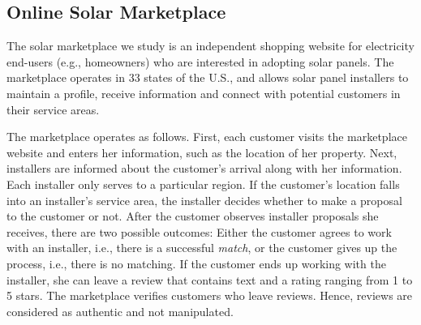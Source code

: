 \documentclass[mnsc,blindrev]{informs3}
\begin{document}
	
	
	
	
	
	\subsection{Online Solar Marketplace}
	
	The solar marketplace we study is an independent shopping website for electricity end-users (e.g., homeowners) who are interested in adopting solar panels.  The marketplace operates in 33 states of the U.S., and allows solar panel installers to maintain a profile, receive information and connect with potential customers in their service areas.
	
	The marketplace operates as follows. First, each customer visits the marketplace website and enters her information, such as the location of her property. Next, installers are informed about the customer's arrival along with her information.  Each installer only serves to a particular region. If the customer's location falls into an installer's service area, the installer decides whether to make a proposal to the customer or not. After the customer observes installer proposals she receives, there are two possible outcomes: Either the customer agrees to work with an installer, i.e., there is a successful \emph{match}, or the customer gives up the process, i.e., there is no matching. If the customer ends up working with the installer, she can leave a review that contains text and a rating ranging from 1 to 5 stars. The marketplace verifies customers who leave reviews. Hence, reviews are considered as authentic and not manipulated.
\end{document}
